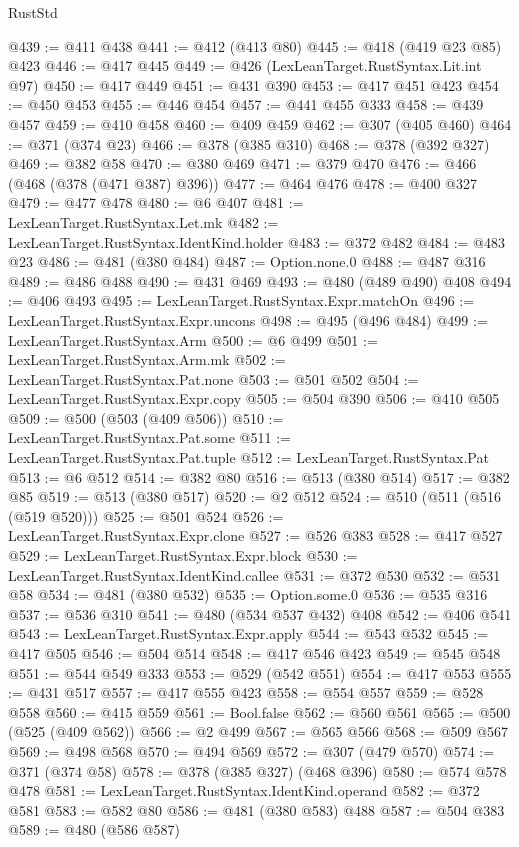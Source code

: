\begin{lexlean}{RustStd}
\begin{coremodule}
@439 := @411 @438
@441 := @412 (@413 @80)
@445 := @418 (@419 @23 @85) @423
@446 := @417 @445
@449 := @426 (LexLeanTarget.RustSyntax.Lit.int @97)
@450 := @417 @449
@451 := @431 @390
@453 := @417 @451 @423
@454 := @450 @453
@455 := @446 @454
@457 := @441 @455 @333
@458 := @439 @457
@459 := @410 @458
@460 := @409 @459
@462 := @307 (@405 @460)
@464 := @371 (@374 @23)
@466 := @378 (@385 @310)
@468 := @378 (@392 @327)
@469 := @382 @58
@470 := @380 @469
@471 := @379 @470
@476 := @466 (@468 (@378 (@471 @387) @396))
@477 := @464 @476
@478 := @400 @327
@479 := @477 @478
@480 := @6 @407
@481 := LexLeanTarget.RustSyntax.Let.mk
@482 := LexLeanTarget.RustSyntax.IdentKind.holder
@483 := @372 @482
@484 := @483 @23
@486 := @481 (@380 @484)
@487 := Option.none.{0}
@488 := @487 @316
@489 := @486 @488
@490 := @431 @469
@493 := @480 (@489 @490) @408
@494 := @406 @493
@495 := LexLeanTarget.RustSyntax.Expr.matchOn
@496 := LexLeanTarget.RustSyntax.Expr.uncons
@498 := @495 (@496 @484)
@499 := LexLeanTarget.RustSyntax.Arm
@500 := @6 @499
@501 := LexLeanTarget.RustSyntax.Arm.mk
@502 := LexLeanTarget.RustSyntax.Pat.none
@503 := @501 @502
@504 := LexLeanTarget.RustSyntax.Expr.copy
@505 := @504 @390
@506 := @410 @505
@509 := @500 (@503 (@409 @506))
@510 := LexLeanTarget.RustSyntax.Pat.some
@511 := LexLeanTarget.RustSyntax.Pat.tuple
@512 := LexLeanTarget.RustSyntax.Pat
@513 := @6 @512
@514 := @382 @80
@516 := @513 (@380 @514)
@517 := @382 @85
@519 := @513 (@380 @517)
@520 := @2 @512
@524 := @510 (@511 (@516 (@519 @520)))
@525 := @501 @524
@526 := LexLeanTarget.RustSyntax.Expr.clone
@527 := @526 @383
@528 := @417 @527
@529 := LexLeanTarget.RustSyntax.Expr.block
@530 := LexLeanTarget.RustSyntax.IdentKind.callee
@531 := @372 @530
@532 := @531 @58
@534 := @481 (@380 @532)
@535 := Option.some.{0}
@536 := @535 @316
@537 := @536 @310
@541 := @480 (@534 @537 @432) @408
@542 := @406 @541
@543 := LexLeanTarget.RustSyntax.Expr.apply
@544 := @543 @532
@545 := @417 @505
@546 := @504 @514
@548 := @417 @546 @423
@549 := @545 @548
@551 := @544 @549 @333
@553 := @529 (@542 @551)
@554 := @417 @553
@555 := @431 @517
@557 := @417 @555 @423
@558 := @554 @557
@559 := @528 @558
@560 := @415 @559
@561 := Bool.false
@562 := @560 @561
@565 := @500 (@525 (@409 @562))
@566 := @2 @499
@567 := @565 @566
@568 := @509 @567
@569 := @498 @568
@570 := @494 @569
@572 := @307 (@479 @570)
@574 := @371 (@374 @58)
@578 := @378 (@385 @327) (@468 @396)
@580 := @574 @578 @478
@581 := LexLeanTarget.RustSyntax.IdentKind.operand
@582 := @372 @581
@583 := @582 @80
@586 := @481 (@380 @583) @488
@587 := @504 @383
@589 := @480 (@586 @587)

\end{coremodule}
\end{lexlean}
